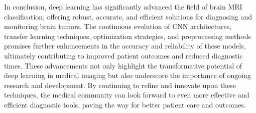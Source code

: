 In conclusion, deep learning has significantly advanced the field of brain MRI classification, offering robust, accurate, and efficient solutions for diagnosing and monitoring brain tumors. The continuous evolution of CNN architectures, transfer learning techniques, optimization strategies, and preprocessing methods promises further enhancements in the accuracy and reliability of these models, ultimately contributing to improved patient outcomes and reduced diagnostic times. These advancements not only highlight the transformative potential of deep learning in medical imaging but also underscore the importance of ongoing research and development. By continuing to refine and innovate upon these techniques, the medical community can look forward to even more effective and efficient diagnostic tools, paving the way for better patient care and outcomes.

